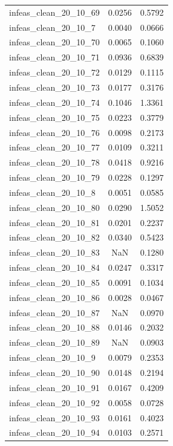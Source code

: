 \begin{longtable}{lcc}
infeas\_clean\_20\_10\_69  &   0.0256 &  0.5792 \\
infeas\_clean\_20\_10\_7   &   0.0040 &  0.0666 \\
infeas\_clean\_20\_10\_70  &   0.0065 &  0.1060 \\
infeas\_clean\_20\_10\_71  &   0.0936 &  0.6839 \\
infeas\_clean\_20\_10\_72  &   0.0129 &  0.1115 \\
infeas\_clean\_20\_10\_73  &   0.0177 &  0.3176 \\
infeas\_clean\_20\_10\_74  &   0.1046 &  1.3361 \\
infeas\_clean\_20\_10\_75  &   0.0223 &  0.3779 \\
infeas\_clean\_20\_10\_76  &   0.0098 &  0.2173 \\
infeas\_clean\_20\_10\_77  &   0.0109 &  0.3211 \\
infeas\_clean\_20\_10\_78  &   0.0418 &  0.9216 \\
infeas\_clean\_20\_10\_79  &   0.0228 &  0.1297 \\
infeas\_clean\_20\_10\_8   &   0.0051 &  0.0585 \\
infeas\_clean\_20\_10\_80  &   0.0290 &  1.5052 \\
infeas\_clean\_20\_10\_81  &   0.0201 &  0.2237 \\
infeas\_clean\_20\_10\_82  &   0.0340 &  0.5423 \\
infeas\_clean\_20\_10\_83  &      NaN &  0.1280 \\
infeas\_clean\_20\_10\_84  &   0.0247 &  0.3317 \\
infeas\_clean\_20\_10\_85  &   0.0091 &  0.1034 \\
infeas\_clean\_20\_10\_86  &   0.0028 &  0.0467 \\
infeas\_clean\_20\_10\_87  &      NaN &  0.0970 \\
infeas\_clean\_20\_10\_88  &   0.0146 &  0.2032 \\
infeas\_clean\_20\_10\_89  &      NaN &  0.0903 \\
infeas\_clean\_20\_10\_9   &   0.0079 &  0.2353 \\
infeas\_clean\_20\_10\_90  &   0.0148 &  0.2194 \\
infeas\_clean\_20\_10\_91  &   0.0167 &  0.4209 \\
infeas\_clean\_20\_10\_92  &   0.0058 &  0.0728 \\
infeas\_clean\_20\_10\_93  &   0.0161 &  0.4023 \\
infeas\_clean\_20\_10\_94  &   0.0103 &  0.2571 \\

\end{longtable}
